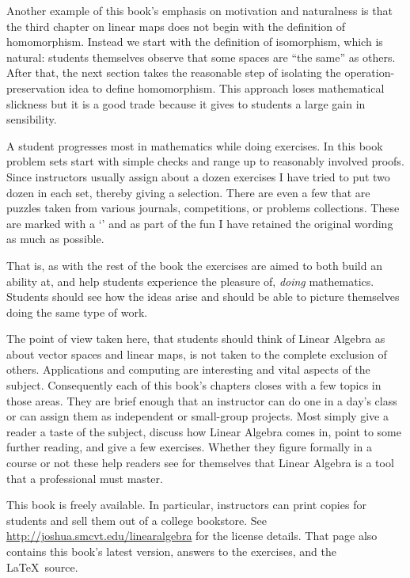 {Another example of this book's emphasis on motivation and naturalness
is that the third chapter on linear maps
does not begin with the definition of homomorphism.
Instead we start with the definition of isomorphism, which
is natural: students themselves
observe that some spaces are ``the same'' as others.
After that,
the next section takes the reasonable step of 
isolating the operation-preservation idea
to define homomorphism.
This approach loses mathematical slickness 
but it is a good trade because it gives to students
a large gain in sensibility.

A student progresses most in mathematics while doing exercises. 
In this book problem sets start with 
simple checks and range up to reasonably involved proofs.
Since instructors usually assign about a dozen exercises
I have tried to put two dozen in each set, 
thereby giving a selection.
There are even a few that are puzzles
taken from various journals, competitions, or
problems collections. 
These are marked with a
`\puzzlemark' and 
as part of the fun I have retained the original wording
as much as possible.

That is, as with the rest of the book 
the exercises are aimed to both build an ability at,
and help students experience the pleasure of, 
\emph{doing} mathematics.
Students should see how the ideas arise and should be able to 
picture themselves doing the same type of work.


\medskip
{}
The point of view taken here, that students should think of 
Linear Algebra as about vector spaces
and linear maps, is not taken to the complete exclusion of others.
Applications and computing are interesting and vital aspects 
of the subject.
Consequently each of this book's chapters closes with a few 
topics in those areas.
They are brief enough that an instructor can do one
in a day's class 
or can assign them as independent or small-group projects.
Most simply give a reader
a taste of the subject, discuss how Linear Algebra comes in,
point to some further reading, and give a few exercises. 
Whether they figure formally in a course or not these help
readers see for themselves that Linear Algebra is a tool
that a professional must master. 




\medskip
{}
This book is freely available.
In particular, instructors can print copies for students 
and sell them out of a college bookstore.
See 
\url{http://joshua.smcvt.edu/linearalgebra}
for the license details.
That page also contains this book's latest version,
answers to the exercises, and the \LaTeX\ source.

}
